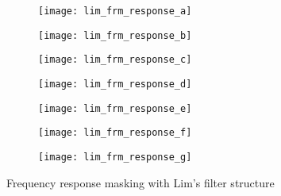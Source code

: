 \documentclass[a4paper,twoside,10pt,english]{report}
\begin{document}
\begin{figure}[!htbp]
\begin{center}
\begin{subfigure}[b]{\textwidth}
\begin{center}
\texttt{[image: lim\_frm\_response\_a]}
\caption{}
\label{fig:Frequency-response-masking-with-Lims-filter-structure_a}
\end{center}
\end{subfigure}
\begin{subfigure}[b]{\textwidth}
\begin{center}
\texttt{[image: lim\_frm\_response\_b]}
\caption{}
\label{fig:Frequency-response-masking-with-Lims-filter-structure_b}
\end{center}
\end{subfigure}
\begin{subfigure}[b]{\textwidth}
\begin{center}
\texttt{[image: lim\_frm\_response\_c]}
\caption{}
\label{fig:Frequency-response-masking-with-Lims-filter-structure_c}
\end{center}
\end{subfigure}
\begin{subfigure}[b]{\textwidth}
\begin{center}
\texttt{[image: lim\_frm\_response\_d]}
\caption{}
\label{fig:Frequency-response-masking-with-Lims-filter-structure_d}
\end{center}
\end{subfigure}
\begin{subfigure}[b]{\textwidth}
\begin{center}
\texttt{[image: lim\_frm\_response\_e]}
\caption{}
\label{fig:Frequency-response-masking-with-Lims-filter-structure_e}
\end{center}
\end{subfigure}
\begin{subfigure}[b]{\textwidth}
\begin{center}
\texttt{[image: lim\_frm\_response\_f]}
\caption{}
\label{fig:Frequency-response-masking-with-Lims-filter-structure_f}
\end{center}
\end{subfigure}
\begin{subfigure}[b]{\textwidth}
\begin{center}
\texttt{[image: lim\_frm\_response\_g]}
\caption{}
\label{fig:Frequency-response-masking-with-Lims-filter-structure_g}
\end{center}
\end{subfigure}
\vspace{0.5cm}
\caption{Frequency response masking with Lim's filter structure}
\label{fig:Frequency-response-masking-with-Lims-filter-structure}
\end{center}
\end{figure}
\end{document}

